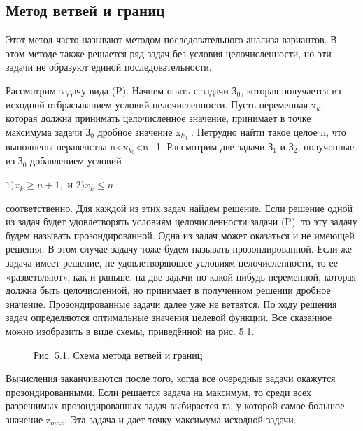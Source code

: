 \subsection{Метод ветвей и границ}

Этот метод часто называют методом последовательного анализа вариантов. В этом методе также решается ряд задач без условия целочисленности, но эти задачи не образуют единой последовательности.

Рассмотрим  задачу вида (P). Начнем опять с задачи З$_0$, которая получается из исходной отбрасыванием условий целочисленности. Пусть переменная  x$_k$, которая должна принимать целочисленное значение, принимает в точке максимума задачи З$_0$ дробное значение x$_{k_0}$ . Нетрудно найти такое целое n, что выполнены неравенства n<x$_{k_0}$<n+1. Рассмотрим две задачи З$_1$ и З$_2$, полученные из З$_0$ добавлением условий
\begin{center}
$1 )x_k \geq n+1,$ и $2) x_k \leq n$
\end{center}
соответственно. Для каждой из этих задач найдем решение. Если решение одной из задач будет удовлетворять условиям целочисленности задачи (P), то эту задачу будем называть прозондированной. Одна из задач может оказаться и не имеющей решения. В этом случае задачу тоже будем называть прозондированной. Если же задача имеет решение, не удовлетворяющее условиям целочисленности, то ее «разветвляют», как и раньше, на две задачи по какой-нибудь переменной, которая должна быть целочисленной, но принимает в полученном решении дробное значение. Прозондированные задачи далее уже не ветвятся. По ходу решения задач определяются оптимальные значения целевой функции. Все сказанное можно изобразить в виде схемы, приведённой на рис. 5.1.

\begin{figure}[h]
\caption*{Рис. 5.1. Схема метода ветвей и границ}
\label{picture_5_1}
\end{figure}

Вычисления заканчиваются после того, когда все очередные задачи окажутся прозондированными. Если решается задача на максимум, то среди всех разрешимых прозондированных задач выбирается та, у которой самое большое значение z$_{max}$. Эта задача и дает точку максимума исходной задачи.

